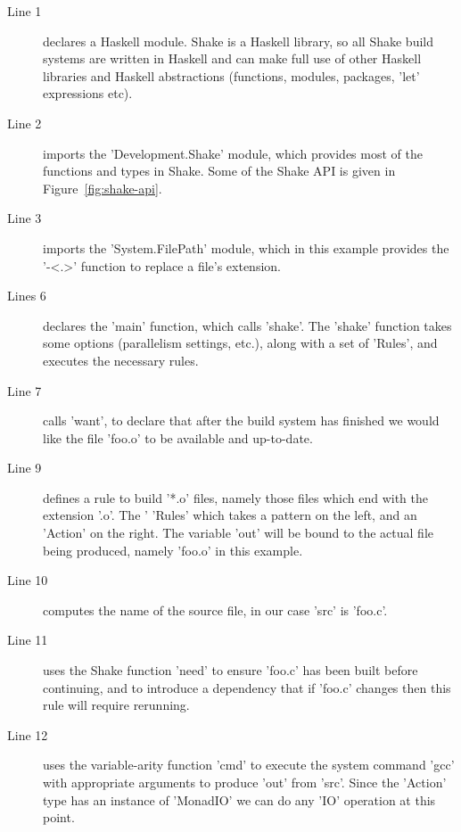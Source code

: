 \begin{description}
\item[Line 1] declares a Haskell module. Shake is a Haskell library, so all
Shake build systems are written in Haskell and can make full use of other
Haskell libraries and Haskell abstractions (functions, modules, packages,
\lst'let' expressions etc).
\item[Line 2] imports the \lst'Development.Shake' module, which provides most of
the functions and types in Shake. Some of the Shake API is given in
Figure~\ref{fig:shake-api}.
\item[Line 3] imports the \lst'System.FilePath' module, which in this example
provides the \lst'-<.>' function to replace a file's extension.
\item[Lines 6] declares the \lst'main' function, which calls \lst'shake'. The
\lst'shake' function takes some options (parallelism settings, etc.), along with
a set of \lst'Rules', and executes the necessary rules.
\item[Line 7] calls \lst'want', to declare that after the build system has
finished we would like the file \lst'foo.o' to be available and up-to-date.
\item[Line 9] defines a rule to build \lst'*.o' files, namely those files which
end with the extension \lst'.o'. The \lst'%
\lst'Rules' which takes a pattern on the left, and an \lst'Action' on the
right. The variable \lst'out' will be bound to the actual file being produced,
namely \lst'foo.o' in this example.
\item[Line 10] computes the name of the source file, in our case \lst'src' is \lst'foo.c'.
\item[Line 11] uses the Shake function \lst'need' to ensure \lst'foo.c' has been built before
continuing, and to introduce a dependency that if \lst'foo.c' changes then this
rule will require rerunning.
\item[Line 12] uses the variable-arity function \lst'cmd' to execute the system
command \lst'gcc' with appropriate arguments to produce \lst'out' from
\lst'src'. Since the \lst'Action' type has an instance of \lst'MonadIO' we can
do any \lst'IO' operation at this point.
\end{description}

